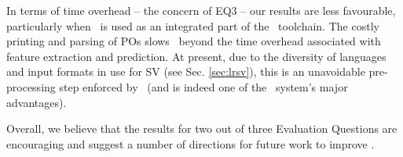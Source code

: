 In terms of time overhead -- the concern of EQ3 -- our results are less favourable, particularly when \where~is used as an integrated part of the \why~toolchain.
The costly printing and parsing of POs slows \where~beyond the time overhead associated with feature extraction and prediction.
At present, due to the diversity of languages and input formats in use for SV (see Sec. \ref{sec:lrsv}), this is an unavoidable pre-processing step enforced by \why~(and is indeed one of the \why~system's major advantages).

Overall, we believe that the results for two out of three Evaluation Questions are encouraging and suggest a number of directions for future work to improve \where.
 

 

